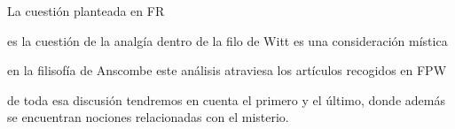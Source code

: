La cuestión planteada en FR

es la cuestión de la analgía
dentro de la filo de Witt es una consideración mística

en la filisofía de Anscombe este análisis atraviesa los artículos recogidos en FPW

de toda esa discusión tendremos en cuenta el primero y el último, donde además se encuentran nociones relacionadas con el misterio.

